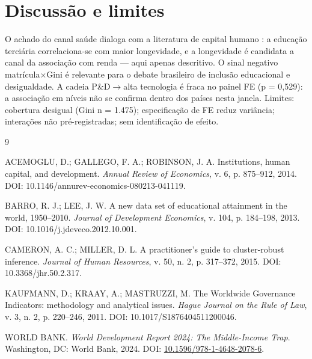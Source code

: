 \documentclass[12pt,a4paper]{article}
\begin{document}
\section{Discussão e limites}

O achado do canal saúde dialoga com a literatura de capital humano \cite{acemoglu2014,barro2013}: a educação terciária correlaciona-se com maior longevidade, e a longevidade é candidata a canal da associação com renda --- aqui apenas descritivo. O sinal negativo matrícula$\times$Gini é relevante para o debate brasileiro de inclusão educacional e desigualdade. A cadeia P\&D$\rightarrow$alta tecnologia é fraca no painel FE (p = 0,529): a associação em níveis não se confirma dentro dos países nesta janela. Limites: cobertura desigual (Gini n = 1.475); especificação de FE reduz variância; interações não pré-registradas; sem identificação de efeito.

\begin{thebibliography}{9}

ACEMOGLU, D.; GALLEGO, F. A.; ROBINSON, J. A. Institutions, human capital, and development. \emph{Annual Review of Economics}, v. 6, p. 875--912, 2014. DOI: 10.1146/annurev-economics-080213-041119.

BARRO, R. J.; LEE, J. W. A new data set of educational attainment in the world, 1950--2010. \emph{Journal of Development Economics}, v. 104, p. 184--198, 2013. DOI: 10.1016/j.jdeveco.2012.10.001.

CAMERON, A. C.; MILLER, D. L. A practitioner's guide to cluster-robust inference. \emph{Journal of Human Resources}, v. 50, n. 2, p. 317--372, 2015. DOI: 10.3368/jhr.50.2.317.

KAUFMANN, D.; KRAAY, A.; MASTRUZZI, M. The Worldwide Governance Indicators: methodology and analytical issues. \emph{Hague Journal on the Rule of Law}, v. 3, n. 2, p. 220--246, 2011. DOI: 10.1017/S1876404511200046.

WORLD BANK. \emph{World Development Report 2024: The Middle-Income Trap}. Washington, DC: World Bank, 2024. DOI: \href{https://doi.org/10.1596/978-1-4648-2078-6}{10.1596/978-1-4648-2078-6}.

\end{thebibliography}
\end{document}
